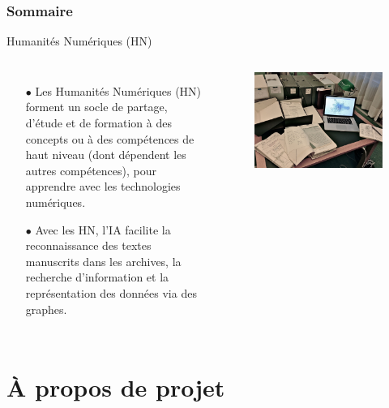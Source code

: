 \documentclass[xcolor=dvipsnames]{beamer}
\begin{document}
\begin{frame}
\frametitle{Sommaire}
\tableofcontents[currentsection]
\end{frame}

\begin{frame}{Humanités Numériques (HN)}
\begin{columns}
		\begin{itemize}
		\item[$\bullet$] Les Humanités Numériques (HN) forment un socle de partage, d'étude et de formation à des concepts ou à des compétences de haut niveau (dont dépendent les autres compétences), pour apprendre avec les technologies numériques.
		
		\item[$\bullet$] Avec les HN, l’IA facilite la reconnaissance des textes manuscrits dans les archives, la recherche d’information et la représentation des données via des graphes.
	\end{itemize}	
	\begin{figure}[ht]
		\begin{center}
			\includegraphics[width=\textwidth]{./images/Humanites_Numeriques.JPG}
		\end{center}
	\end{figure}
\end{columns}
\end{frame}

\section{À propos de projet}
\end{document}
